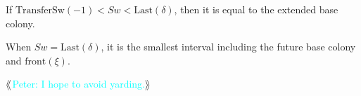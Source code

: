 \documentclass[12pt]{memoir}
\newcommand{\authnote}[3]
{{ \textcolor{#3}{$\langle\hspace{-0.2em}\langle$\textsf{\footnotesize #1: #2}$\rangle\hspace{-0.2em}\rangle$}}}
\newcommand{\authnote}[2]{}
\newcommand{\Pnote}[1]{{\authnote{Peter}{#1}{cyan}}}
\newcommand{\fld}[1]{\ensuremath{\textit{#1}}}
\def\B{B}
\newcommand{\cKind}{\fld{cKind}}
\newcommand{\Sweep}{\fld{Sw}}
\newcommand{\Bridge}{\mathrm{Bridge}}
\newcommand{\front}{\mathrm{front}}
\newcommand{\Last}{\mathrm{Last}}
\newcommand{\Member}{\mathrm{Member}}
\newcommand{\TransferSw}{\mathrm{TransferSw}}
\begin{document}
\begin{definition}
\begin{flushdescription}
\begin{bullets}
            \item If \( \TransferSw(-1) < \Sweep < \Last(\delta) \),
                  then it is equal to the extended base colony.
            \item When \( \Sweep = \Last(\delta) \), it is
                  the smallest interval including the future
                  base colony and \( \front(\xi) \).
        \end{bullets}


\Pnote{I hope to avoid yarding.}










\end{flushdescription}
\end{definition}
\end{document}
